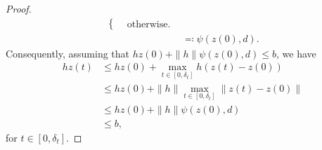 \documentclass[10pt,a4paper]{amsart}
\begin{document}
\begin{proof}
\begin{align*}
\begin{cases}
            &\text{otherwise.}
        \end{cases}\\
        &\eqqcolon \psi(z(0),d).
    \end{align*}
    Consequently, assuming that $hz(0)+\|h\|\psi(z(0),d) \leq b$, we have
    \begin{align*}
    	hz(t) &\leq hz(0) + \max_{t\in[0,\delta_t]}h(z(t)-z(0)) 
    	\\&\leq hz(0) + \|h\|\max_{t\in[0,\delta_t]}\|z(t)-z(0)\| 
    	\\&\leq  hz(0)+\|h\|\psi(z(0),d)  
    	\\&\leq b,
    \end{align*} 
    for $t\in[0,\delta_t]$.
\end{proof}
\end{document}
